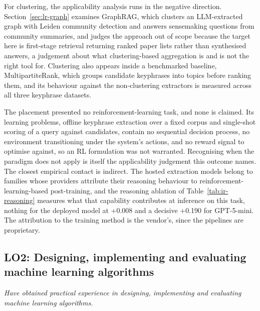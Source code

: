For clustering, the applicability analysis runs in the negative
direction. Section~\ref{sec:lr-graph} examines GraphRAG, which clusters
an LLM-extracted graph with Leiden community detection and answers
sensemaking questions from community summaries, and judges the approach
out of scope because the target here is first-stage retrieval returning
ranked paper lists rather than synthesised answers, a judgement about
what clustering-based aggregation is and is not the right tool for.
Clustering also appears inside a benchmarked baseline, MultipartiteRank,
which groups candidate keyphrases into topics before ranking them, and
its behaviour against the non-clustering extractors is measured across
all three keyphrase datasets.

The placement presented no reinforcement-learning task, and none is
claimed. Its learning problems, offline keyphrase extraction over a fixed
corpus and single-shot scoring of a query against candidates, contain no
sequential decision process, no environment transitioning under the
system's actions, and no reward signal to optimise against, so an RL
formulation was not warranted. Recognising when the paradigm does not
apply is itself the applicability judgement this outcome names. The
closest empirical contact is indirect. The hosted extraction models
belong to families whose providers attribute their reasoning behaviour to
reinforcement-learning-based post-training, and the reasoning ablation of
Table~\ref{tab:ir-reasoning} measures what that capability contributes at
inference on this task, nothing for the deployed model at +0.008 and a
decisive +0.190 for GPT-5-mini. The attribution to the training method is
the vendor's, since the pipelines are proprietary.

\subsection{LO2: Designing, implementing and evaluating machine learning algorithms}
\textit{Have obtained practical experience in designing, implementing and
evaluating machine learning algorithms.}

